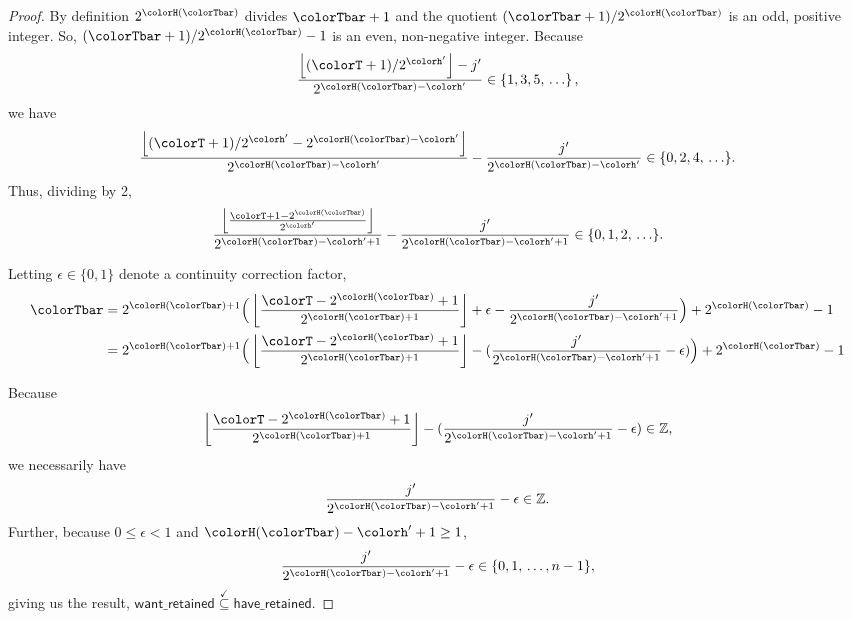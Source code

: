 \begin{proof}
By definition $2^{\colorH(\colorTbar)}$ divides $\colorTbar + 1$ and the quotient $(\colorTbar + 1) / 2^{\colorH(\colorTbar)}$ is an odd, positive integer.
So, $(\colorTbar + 1) / 2^{\colorH(\colorTbar)} - 1$ is an even, non-negative integer.
Because
\begin{align*}
\frac{\left\lfloor (\colorT + 1) / 2^{\colorh'} \right\rfloor - j'}{2^{\colorH(\colorTbar) - \colorh'}} \in \{1, 3, 5, \, \ldots\} \, ,
\end{align*}
we have
\begin{align*}
\frac{\left\lfloor (\colorT + 1) / 2^{\colorh'} - 2^{\colorH(\colorTbar) - \colorh'} \right\rfloor}{2^{\colorH(\colorTbar) - \colorh'}}
- \frac{j'}{2^{\colorH(\colorTbar) - \colorh'}} \in \{0, 2, 4, \, \ldots\}.
\end{align*}
Thus, dividing by 2,
\begin{align*}
\frac{
  \left\lfloor
  \frac{\colorT + 1 - 2^{\colorH(\colorTbar)}}{2^{\colorh'}}
  \right\rfloor
}{
  2^{\colorH(\colorTbar) - \colorh' + 1}
}
- \frac{j'}{
  2^{\colorH(\colorTbar) - \colorh' + 1}
}
\in \{0,1,2,\,\ldots\}.
\end{align*}

Letting $\epsilon \in \{0, 1\}$ denote a continuity correction factor,
\begin{align*}
\colorTbar
&= 2^{\colorH(\colorTbar) + 1}
\Big(
\left\lfloor
\frac{
  \colorT - 2^{\colorH(\colorTbar)} + 1
}{
  2^{\colorH(\colorTbar) + 1}
}
\right\rfloor
+ \epsilon
- \frac{j'}{2^{\colorH(\colorTbar) - \colorh' + 1}}
\Big)
+ 2^{\colorH(\colorTbar)}
- 1\\
&= 2^{\colorH(\colorTbar) + 1}
\Big(
\left\lfloor
\frac{
  \colorT - 2^{\colorH(\colorTbar)} + 1
}{
  2^{\colorH(\colorTbar) + 1}
}
\right\rfloor
- (
  \frac{j'}{2^{\colorH(\colorTbar) - \colorh' + 1}}
  - \epsilon
)
\Big)
+ 2^{\colorH(\colorTbar)}
- 1\\
\end{align*}

Because
\begin{align*}
\left\lfloor
\frac{
  \colorT - 2^{\colorH(\colorTbar)} + 1
}{
  2^{\colorH(\colorTbar) + 1}
}
\right\rfloor
- (
\frac{j'}{2^{\colorH(\colorTbar) - \colorh' + 1}}
- \epsilon
)
\in \mathbb{Z},
\end{align*}
we necessarily have
\begin{align*}
\frac{j'}{2^{\colorH(\colorTbar) - \colorh' + 1}}
- \epsilon
\in \mathbb{Z}.
\end{align*}
Further, because $0 \leq \epsilon < 1$ and $\colorH(\colorTbar) - \colorh'  + 1 \geq 1$,
\begin{align*}
\frac{j'}{2^{\colorH(\colorTbar) - \colorh' + 1}}
- \epsilon
\in
\{0, 1, \,\ldots, n - 1\},
\end{align*}
giving us the result, $\mathsf{want\_retained} \stackrel{\checkmark}{\subseteq} \mathsf{have\_retained}$.
\end{proof}
